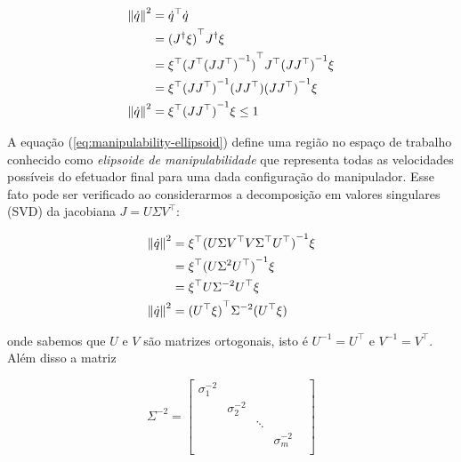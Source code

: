\begin{align}\label{eq:manipulability-ellipsoid}
    \left\Vert \dot{q} \right\Vert^2 & = \dot{q}^\top \dot{q} \notag                                                    \\
                                     & = {(J^\dag \xi)}^\top J^\dag \xi \notag                                          \\
                                     & = \xi^\top {(J^\top {(J J^\top)}^{-1})}^\top J^\top {(J J^\top)}^{-1} \xi \notag \\
                                     & = \xi^\top {(J J^\top)}^{-1} (J J^\top) {(J J^\top)}^{-1} \xi \notag             \\
    \left\Vert \dot{q} \right\Vert^2 & = \xi^\top {(J J^\top)}^{-1} \xi \leq 1
\end{align}

A equação (\ref{eq:manipulability-ellipsoid}) define uma região no espaço de
trabalho conhecido como \emph{elipsoide de manipulabilidade} que representa
todas as velocidades possíveis do efetuador final para uma dada configuração do
manipulador. Esse fato pode ser verificado ao considerarmos a
decomposição em valores singulares (SVD) da jacobiana \(J = U \Sigma V^\top\):

\begin{align}\label{eq:manipulability-ellipsoid-svd}
    \left\Vert \dot{q} \right\Vert^2 & = \xi^\top {(U \Sigma V^\top V \Sigma^\top U^\top)}^{-1} \xi \notag \\
                                     & = \xi^\top {(U \Sigma^2 U^\top)}^{-1} \xi \notag                    \\
                                     & = \xi^\top U \Sigma^{-2} U^\top \xi \notag                          \\
    \left\Vert \dot{q} \right\Vert^2 & = {(U^\top \xi)}^\top \Sigma^{-2} (U^\top \xi)
\end{align}

onde sabemos que \(U\) e \(V\) são matrizes ortogonais, isto é \(U^{-1} =
U^\top\) e \(V^{-1} = V^\top\). Além disso a matriz

\begin{equation}
    \Sigma^{-2} = \begin{bmatrix}
        \sigma_1^{-2} &               &        &               & \\
                      & \sigma_2^{-2} &        &               & \\
                      &               & \ddots &               & \\
                      &               &        & \sigma_m^{-2} & \\
    \end{bmatrix}
\end{equation}

